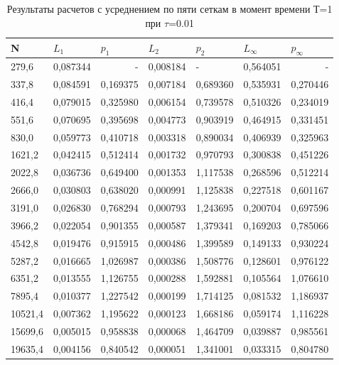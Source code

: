 \documentclass[14pt]{article}
\begin{document}
\begin{table}[]
\begin{tabular}{|l|l|l|l|l|l|l|}
\hline
\multicolumn{1}{|l|}{N} & \multicolumn{1}{l|}{$L_1$}        & \multicolumn{1}{l|}{$p_1$} & \multicolumn{1}{l|}{$L_2$}     & \multicolumn{1}{l|}{$p_2$} & \multicolumn{1}{l|}{$L_\infty$} & \multicolumn{1}{l|}{$p_\infty$} \\ \hline
279,6   & 0,087344 & \multicolumn{1}{r|}{-} & 0,008184 & -        & 0,564051 & \multicolumn{1}{r|}{-} \\ \hline
337,8   & 0,084591 & 0,169375               & 0,007184 & 0,689360 & 0,535931 & 0,270446               \\ \hline
416,4   & 0,079015 & 0,325980               & 0,006154 & 0,739578 & 0,510326 & 0,234019               \\ \hline
551,6   & 0,070695 & 0,395698               & 0,004773 & 0,903919 & 0,464915 & 0,331451               \\ \hline
830,0   & 0,059773 & 0,410718               & 0,003318 & 0,890034 & 0,406939 & 0,325963               \\ \hline
1621,2  & 0,042415 & 0,512414               & 0,001732 & 0,970793 & 0,300838 & 0,451226               \\ \hline
2022,8  & 0,036736 & 0,649400               & 0,001353 & 1,117538 & 0,268596 & 0,512214               \\ \hline
2666,0  & 0,030803 & 0,638020               & 0,000991 & 1,125838 & 0,227518 & 0,601167               \\ \hline
3191,0  & 0,026830 & 0,768294               & 0,000793 & 1,243695 & 0,200704 & 0,697596               \\ \hline
3966,2  & 0,022054 & 0,901355               & 0,000587 & 1,379341 & 0,169203 & 0,785066               \\ \hline
4542,8  & 0,019476 & 0,915915               & 0,000486 & 1,399589 & 0,149133 & 0,930224               \\ \hline
5287,2  & 0,016665 & 1,026987               & 0,000386 & 1,508776 & 0,128601 & 0,976122               \\ \hline
6351,2  & 0,013555 & 1,126755               & 0,000288 & 1,592881 & 0,105564 & 1,076610               \\ \hline
7895,4  & 0,010377 & 1,227542               & 0,000199 & 1,714125 & 0,081532 & 1,186937               \\ \hline
10521,4 & 0,007362 & 1,195622               & 0,000123 & 1,668186 & 0,059174 & 1,116228               \\ \hline
15699,6 & 0,005015 & 0,958838               & 0,000068 & 1,464709 & 0,039887 & 0,985561               \\ \hline
19635,4 & 0,004156 & 0,840542               & 0,000051 & 1,341001 & 0,033315 & 0,804780               \\ \hline
\end{tabular}
\caption{Результаты расчетов с усреднением по пяти сеткам в момент времени Т=1 при $\tau$=0.01}
\end{table}
\end{document}
